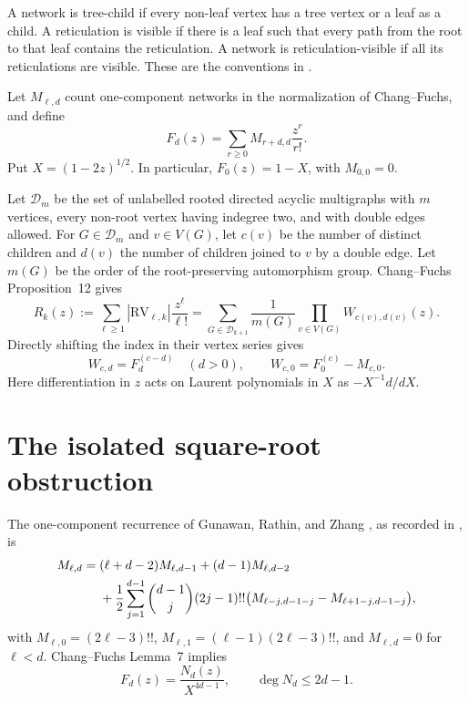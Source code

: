 \documentclass[11pt]{amsart}
\theoremstyle{definition}
\newcommand{\RV}{\mathrm{RV}}
\newcommand{\D}{\mathcal D}
\begin{document}
A network is tree-child if every non-leaf vertex has a tree vertex or a leaf
as a child.  A reticulation is visible if there is a leaf such that every path
from the root to that leaf contains the reticulation.  A network is
reticulation-visible if all its reticulations are visible.  These are the
conventions in \cite{Batle2026,ChangFuchs2024}.

Let $M_{\ell,d}$ count one-component networks in the normalization of
Chang--Fuchs, and define
\[
 F_d(z)=\sum_{r\ge0}M_{r+d,d}\frac{z^r}{r!}.
\]
Put $X=(1-2z)^{1/2}$.  In particular, $F_0(z)=1-X$, with $M_{0,0}=0$.

Let $\D_m$ be the set of unlabelled rooted directed acyclic multigraphs with
$m$ vertices, every non-root vertex having indegree two, and with double
edges allowed.  For $G\in\D_m$ and $v\in V(G)$, let $c(v)$ be the number of
distinct children and $d(v)$ the number of children joined to $v$ by a double
edge.  Let $m(G)$ be the order of the root-preserving automorphism group.
Chang--Fuchs Proposition~12 gives
\begin{equation}\label{eq:CF}
 R_k(z):=\sum_{\ell\ge1}|\RV_{\ell,k}|\frac{z^\ell}{\ell!}
 =\sum_{G\in\D_{k+1}}\frac1{m(G)}
   \prod_{v\in V(G)}W_{c(v),d(v)}(z).
\end{equation}
Directly shifting the index in their vertex series gives
\begin{equation}\label{eq:weights}
 W_{c,d}=F_d^{(c-d)}\quad(d>0),\qquad
 W_{c,0}=F_0^{(c)}-M_{c,0}.
\end{equation}
Here differentiation in $z$ acts on Laurent polynomials in $X$ as
$-X^{-1}d/dX$.

\section{The isolated square-root obstruction}

The one-component recurrence of Gunawan, Rathin, and Zhang
\cite{GunawanRathinZhang2020}, as recorded in \cite{ChangFuchs2024}, is
\begin{align}\label{eq:Mrec}
M_{\ell,d}={}&(\ell+d-2)M_{\ell,d-1}+(d-1)M_{\ell,d-2}\notag\\
&+\frac12\sum_{j=1}^{d-1}\binom{d-1}{j}(2j-1)!!
 \bigl(M_{\ell-j,d-1-j}-M_{\ell+1-j,d-1-j}\bigr),
\end{align}
with $M_{\ell,0}=(2\ell-3)!!$, $M_{\ell,1}=(\ell-1)(2\ell-3)!!$, and
$M_{\ell,d}=0$ for $\ell<d$.  Chang--Fuchs Lemma~7 implies
\begin{equation}\label{eq:Fdshape}
 F_d(z)=\frac{N_d(z)}{X^{4d-1}},\qquad \deg N_d\le2d-1.
\end{equation}
\end{document}
